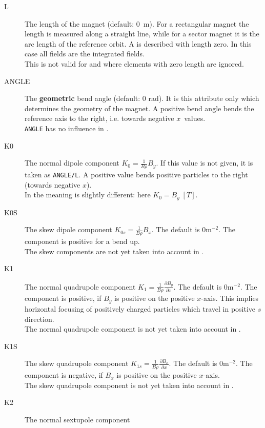 \begin{description}
\item[L]
  The length of the magnet (default: 0~m).
  For a rectangular magnet the length is measured along a straight line,
  while for a sector magnet it is the arc length of the reference orbit.
  A  is described with length zero.
  In this case all fields are the integrated fields. \\
  This is not valid for \opalt and \opalcycl where elements with zero length are ignored.
\item[ANGLE]
  The \textbf{geometric} bend angle (default: 0 rad).
  It is this attribute only which determines the geometry of the magnet.
  A positive bend angle bends the reference axis to the right,
  i.e. towards negative $x$~values. \\
  \texttt{ANGLE} has no influence in \opalt.
\item[K0]
  The normal dipole component
  $K_0=\frac{1}{B \rho}B_y$.
  If this value is not given, it is taken as \texttt{ANGLE/L}.
  A positive value bends positive particles to the right (towards
  negative $x$).\\
  In \opalt the meaning is slightly different: here  $K_0 = B_y\; [T]$.
\item[K0S]
  The skew dipole component
  $K_{0s}=\frac{1}{B \rho}B_x$.
  The default is $0 \mathrm{m}^{-2}$.
  The component is positive for a bend up.\\
  The skew components are not yet taken into account in \opalt.
\item[K1]
  The normal quadrupole component
  $K_1=\frac{1}{B \rho}\frac{\partial B_y}{\partial x}$.
  The default is $0 \mathrm{m}^{-2}$.
  The component is positive, if $B_y$ is positive on the positive $x$-axis.
  This implies horizontal focusing of positively charged particles which
  travel in positive $s$ direction.\\
  The normal quadrupole component is not yet taken into account in \opalt.
\item[K1S]
  The skew quadrupole component
  $K_{1s}=\frac{1}{B \rho}\frac{\partial B_x}{\partial x}$.
  The default is $0 \mathrm{m}^{-2}$.
  The component is negative, if $B_x$ is positive on the positive $x$-axis.\\
  The skew quadrupole component is not yet taken into account in \opalt.
\item[K2]
  The normal sextupole component

\end{description}
